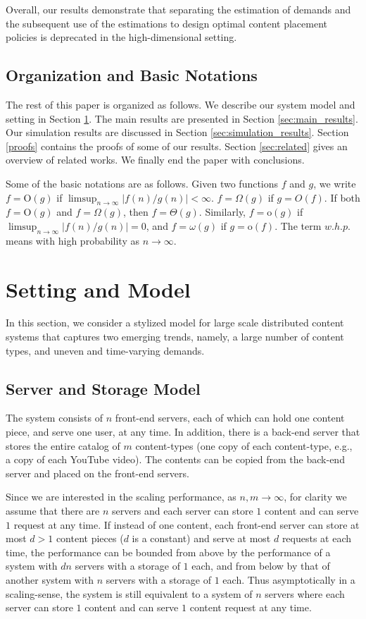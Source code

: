 \documentclass[10pt, conference, letterpaper]{IEEEtran}
\def \OO {\mathrm{O}}
\def \oo {\mathrm{o}}
\begin{document}
Overall, our results demonstrate that separating the estimation of
demands and the subsequent use of the estimations to design optimal
content placement policies is deprecated in the high-dimensional
setting.


\subsection{Organization and Basic Notations}
The rest of this paper is organized as follows. We describe our system model and setting in Section \ref{sec:system_model}. The main results are presented in Section \ref{sec:main_results}. Our simulation results are discussed in Section \ref{sec:simulation_results}. Section \ref{proofs} contains the proofs of some of our results. Section \ref{sec:related} gives an overview of related works. We finally end the paper with conclusions. 

Some of the basic notations are as follows. Given two functions $f$ and $g$, we write $f=\OO(g)$ if $\limsup_{n \to \infty} |f(n)/g(n)|<\infty$. $f=\Omega(g)$ if $g=O(f)$. If both $f=\OO(g)$ and $f=\Omega(g)$, then $f=\Theta(g)$. Similarly, $f=\oo(g)$ if $\limsup_{n\to \infty} |f(n)/g(n)|=0$, and $f=\omega(g)$ if $g=\oo(f)$. The term $w.h.p.$ means with high probability as $n \to \infty$.  

\section{Setting and Model}
\label{sec:system_model}
In this section, we consider a stylized model for large scale
distributed content systems that captures two emerging trends, namely,
a large number of content types, and uneven and time-varying demands.

\subsection{Server and Storage Model}


The system consists of $n$ front-end servers, each of which can hold one content piece, and serve one user, at any time. In addition, there is a back-end server that stores the entire
catalog of $m$ content-types (one copy of each content-type, e.g., a
copy of each YouTube video). The contents can be copied from the
back-end server and placed on the front-end servers. 

Since we are interested in the scaling performance, as $n,m \to \infty$, for clarity we assume that there are $n$ servers and each server can store $1$ content and can serve $1$
request at any time. If instead of one content, each front-end server can store at most $d>1$ content pieces ($d$ is a constant) and serve at most $d$ requests at each time, the performance can be bounded from above by the performance of a system with $d n$ servers with a storage of $1$ each, and from below by that of another system with $n$ servers with a storage of $1$ each. Thus asymptotically in a scaling-sense, the system is still equivalent to a system of $n$ servers where each server can store $1$ content and can serve $1$ content request at any time. 
\end{document}
